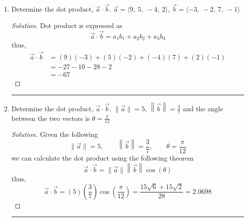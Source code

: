 \documentclass[12pt]{article}
\begin{document}
		\begin{enumerate}
			\item[1.)] Determine the dot product, \(\vec{a} \cdot \vec{b}\). \(\vec{a} = \langle 9,~5,~-4,~2\rangle\), \(\vec{b} = \langle -3,~-2,~7,~-1\rangle\)
				\begin{proof}[Solution]
					Dot product is expressed as
					\[\vec{a}\cdot \vec{b} = a_1b_1+a_2b_2+a_3b_3\]
					thus,
					\begin{align*}
						\vec{a}\cdot\vec{b} & = \left(9\right)\left(-3\right)+\left(5\right)\left(-2\right)+\left(-4\right)\left(7\right)+\left(2\right)\left(-1\right) \\
						& = -27-10-28-2 \\
						& = -67
					\end{align*}
				\end{proof}
				\hrule
			
			\item[3.)] Determine the dot product, \(\vec{a} \cdot \vec{b}\). \(\|\vec{a}\| = 5\), \(\displaystyle \left\|\vec{b}\right\| = \frac{3}{7}\) and the angle between the two vectors is \(\displaystyle \theta = \frac{\pi}{12}\)
				\begin{proof}[Solution]
					Given the following
					\[\|\vec{a}\| = 5, \qquad \left\|\vec{b}\right\| = \frac{3}{7},\qquad \theta = \frac{\pi}{12}\]
					we can calculate the dot product using the following theorem
					\[\vec{a}\cdot\vec{b} = \|\vec{a}\| \left\|\vec{b}\right\|\cos \left(\theta\right)\]
					thus,
					\[\vec{a}\cdot\vec{b} = \left(5\right)\left(\frac{3}{7}\right)\cos\left(\frac{\pi}{12}\right) = \frac{15\sqrt{6}+15\sqrt{2}}{28} = 2.0698\]
				\end{proof}
				\hrule
			

\end{enumerate}
\end{document}
